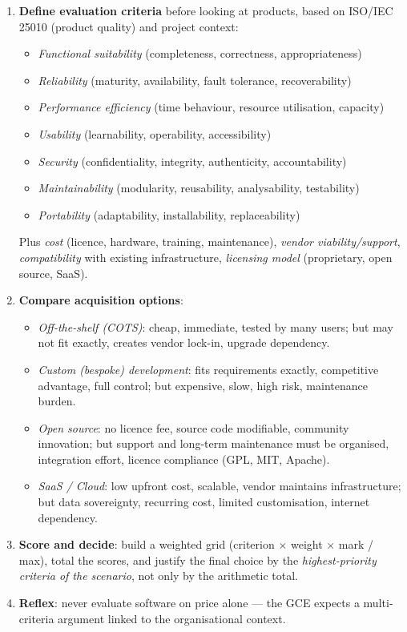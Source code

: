 \documentclass[11pt]{article}
\begin{document}
\begin{methode}
\begin{enumerate}
\item \textbf{Define evaluation criteria} before looking at products, based on ISO/IEC 25010 (product quality) and project context:
\begin{itemize}
\item \emph{Functional suitability} (completeness, correctness, appropriateness)
\item \emph{Reliability} (maturity, availability, fault tolerance, recoverability)
\item \emph{Performance efficiency} (time behaviour, resource utilisation, capacity)
\item \emph{Usability} (learnability, operability, accessibility)
\item \emph{Security} (confidentiality, integrity, authenticity, accountability)
\item \emph{Maintainability} (modularity, reusability, analysability, testability)
\item \emph{Portability} (adaptability, installability, replaceability)
\end{itemize}
Plus \emph{cost} (licence, hardware, training, maintenance), \emph{vendor viability/support}, \emph{compatibility} with existing infrastructure, \emph{licensing model} (proprietary, open source, SaaS).
\item \textbf{Compare acquisition options}:
\begin{itemize}
\item \emph{Off-the-shelf (COTS)}: cheap, immediate, tested by many users; but may not fit exactly, creates vendor lock-in, upgrade dependency.
\item \emph{Custom (bespoke) development}: fits requirements exactly, competitive advantage, full control; but expensive, slow, high risk, maintenance burden.
\item \emph{Open source}: no licence fee, source code modifiable, community innovation; but support and long-term maintenance must be organised, integration effort, licence compliance (GPL, MIT, Apache).
\item \emph{SaaS / Cloud}: low upfront cost, scalable, vendor maintains infrastructure; but data sovereignty, recurring cost, limited customisation, internet dependency.
\end{itemize}
\item \textbf{Score and decide}: build a weighted grid (criterion $\times$ weight $\times$ mark / max), total the scores, and justify the final choice by the \emph{highest-priority criteria of the scenario}, not only by the arithmetic total.
\item \textbf{Reflex}: never evaluate software on price alone — the GCE expects a multi-criteria argument linked to the organisational context.
\end{enumerate}
\end{methode}
\end{document}
